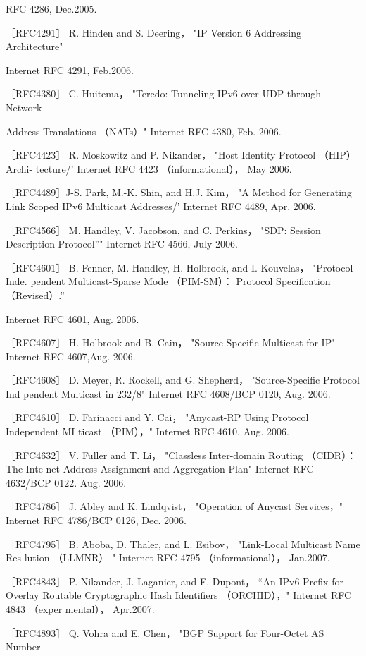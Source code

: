 RFC 4286, Dec.2005.

［RFC4291］ R. Hinden and S. Deering， "IP Version 6 Addressing Architecture"

Internet RFC 4291, Feb.2006.

［RFC4380］ C. Huitema， "Teredo: Tunneling IPv6 over UDP through Network

Address Translations （NATs）" Internet RFC 4380, Feb. 2006.

［RFC4423］ R. Moskowitz and P. Nikander， "Host Identity Protocol （HIP） Archi-
tecture/' Internet RFC 4423 （informational）， May 2006.

［RFC4489］J-S. Park, M.-K. Shin, and H.J. Kim， "A Method for Generating Link
Scoped IPv6 Multicast Addresses/' Internet RFC 4489, Apr. 2006.

［RFC4566］ M. Handley, V. Jacobson, and C. Perkins， "SDP: Session Description
Protocol”" Internet RFC 4566, July 2006.

［RFC4601］ B. Fenner, M. Handley, H. Holbrook, and I. Kouvelas， "Protocol Inde.
pendent Multicast-Sparse Mode （PIM-SM）： Protocol Specification （Revised）.”

Internet RFC 4601, Aug. 2006.

［RFC4607］ H. Holbrook and B. Cain， "Source-Specific Multicast for IP" Internet
RFC 4607,Aug. 2006.

［RFC4608］ D. Meyer, R. Rockell, and G. Shepherd， "Source-Specific Protocol Ind
pendent Multicast in 232/8" Internet RFC 4608/BCP 0120, Aug. 2006.

［RFC4610］ D. Farinacci and Y. Cai， "Anycast-RP Using Protocol Independent MI
ticast （PIM），" Internet RFC 4610, Aug. 2006.

［RFC4632］ V. Fuller and T. Li， "Classless Inter-domain Routing （CIDR）： The Inte
net Address Assignment and Aggregation Plan" Internet RFC 4632/BCP 0122.
Aug. 2006.

［RFC4786］ J. Abley and K. Lindqvist， "Operation of Anycast Services，" Internet
RFC 4786/BCP 0126, Dec. 2006.

［RFC4795］ B. Aboba, D. Thaler, and L. Esibov， "Link-Local Multicast Name Res
lution （LLMNR） " Internet RFC 4795 （informational）， Jan.2007.

［RFC4843］ P. Nikander, J. Laganier, and F. Dupont， “An IPv6 Prefix for Overlay
Routable Cryptographic Hash Identifiers （ORCHID），" Internet RFC 4843 （exper
mental）， Apr.2007.

［RFC4893］ Q. Vohra and E. Chen， "BGP Support for Four-Octet AS Number

